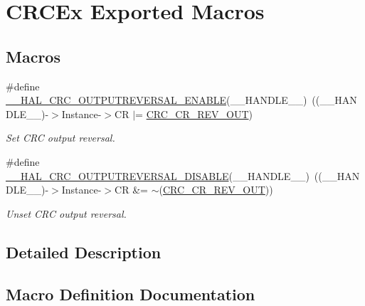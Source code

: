 \hypertarget{group___c_r_c_ex___exported___macros}{}\section{C\+R\+C\+Ex Exported Macros}
\label{group___c_r_c_ex___exported___macros}
\subsection*{Macros}
\begin{DoxyCompactItemize}
\item 
\#define \hyperlink{group___c_r_c_ex___exported___macros_ga260d1889690fbb69503e9c93340b554d}{\+\_\+\+\_\+\+H\+A\+L\+\_\+\+C\+R\+C\+\_\+\+O\+U\+T\+P\+U\+T\+R\+E\+V\+E\+R\+S\+A\+L\+\_\+\+E\+N\+A\+B\+LE}(\+\_\+\+\_\+\+H\+A\+N\+D\+L\+E\+\_\+\+\_\+)~((\+\_\+\+\_\+\+H\+A\+N\+D\+L\+E\+\_\+\+\_\+)-\/$>$Instance-\/$>$CR $\vert$= \hyperlink{group___peripheral___registers___bits___definition_ga62d72fcad54fe50ab75d2895d6e155f7}{C\+R\+C\+\_\+\+C\+R\+\_\+\+R\+E\+V\+\_\+\+O\+UT})
\begin{DoxyCompactList}\small\item\em Set C\+RC output reversal. \end{DoxyCompactList}\item 
\#define \hyperlink{group___c_r_c_ex___exported___macros_ga3568e4344c4a326d468bedea8ea3878a}{\+\_\+\+\_\+\+H\+A\+L\+\_\+\+C\+R\+C\+\_\+\+O\+U\+T\+P\+U\+T\+R\+E\+V\+E\+R\+S\+A\+L\+\_\+\+D\+I\+S\+A\+B\+LE}(\+\_\+\+\_\+\+H\+A\+N\+D\+L\+E\+\_\+\+\_\+)~((\+\_\+\+\_\+\+H\+A\+N\+D\+L\+E\+\_\+\+\_\+)-\/$>$Instance-\/$>$CR \&= $\sim$(\hyperlink{group___peripheral___registers___bits___definition_ga62d72fcad54fe50ab75d2895d6e155f7}{C\+R\+C\+\_\+\+C\+R\+\_\+\+R\+E\+V\+\_\+\+O\+UT}))
\begin{DoxyCompactList}\small\item\em Unset C\+RC output reversal. \end{DoxyCompactList}\end{DoxyCompactItemize}


\subsection{Detailed Description}


\subsection{Macro Definition Documentation}
\mbox{\label{group___c_r_c_ex___exported___macros_ga3568e4344c4a326d468bedea8ea3878a}} 
